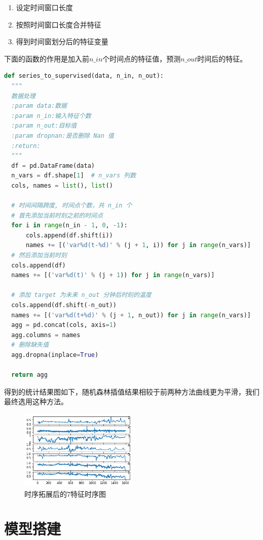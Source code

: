 \documentclass[11pt,a4paper]{elegantpaper}
\begin{document}
\begin{multicols}{2}
\begin{enumerate}
  \item 设定时间窗口长度
  \item 按照时间窗口长度合并特征
  \item 得到时间窗划分后的特征变量
\end{enumerate}

下面的函数的作用是加入前$n\_in$个时间点的特征值，预测$n\_out$时间后的特征。

\begin{lstlisting}[language=Python]
def series_to_supervised(data, n_in, n_out):
  """
  数据处理
  :param data:数据
  :param n_in:输入特征个数
  :param n_out:目标值
  :param dropnan:是否删除 Nan 值 
  :return:
  """
  df = pd.DataFrame(data)
  n_vars = df.shape[1]  # n_vars 列数
  cols, names = list(), list()
  
  # 时间间隔跨度, 时间点个数，共 n_in 个
  # 首先添加当前时刻之前的时间点
  for i in range(n_in - 1, 0, -1):
      cols.append(df.shift(i))
      names += [('var%d(t-%d)' % (j + 1, i)) for j in range(n_vars)]
  # 然后添加当前时刻
  cols.append(df)
  names += [('var%d(t)' % (j + 1)) for j in range(n_vars)]

  # 添加 target 为未来 n_out 分钟后时刻的温度
  cols.append(df.shift(-n_out))
  names += [('var%d(t+%d)' % (j + 1, n_out)) for j in range(n_vars)]
  agg = pd.concat(cols, axis=1)
  agg.columns = names
  # 删除缺失值
  agg.dropna(inplace=True)

  return agg
\end{lstlisting}

得到的统计结果图如下，随机森林插值结果相较于前两种方法曲线更为平滑，我们最终选用这种方法。

\begin{figure}[H]
  \centering
  \includegraphics[width=0.5\textwidth]{images/FFF.png}
  \caption{时序拓展后的7特征时序图}
\end{figure}

\section{模型搭建}


\end{multicols}
\end{document}

